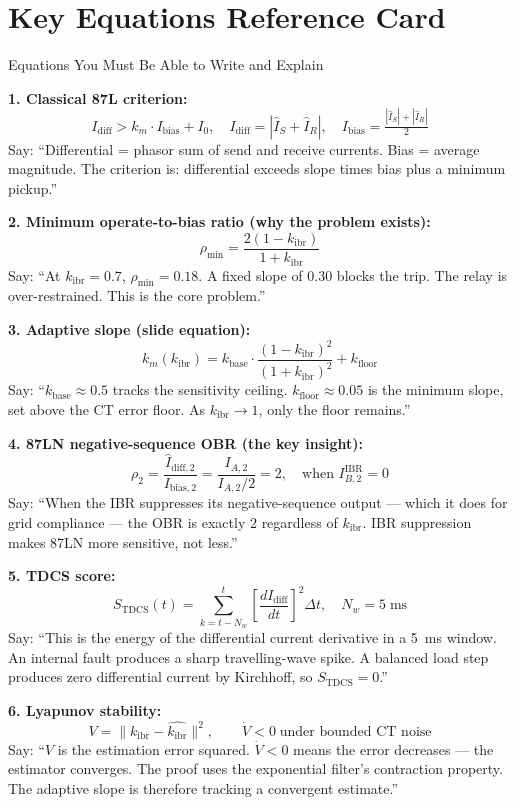 \documentclass[12pt,a4paper]{article}
\newcommand{\kibr}{k_\mathrm{ibr}}
\newcommand{\Idiff}{I_\mathrm{diff}}
\newcommand{\Ibias}{I_\mathrm{bias}}
\newcommand{\km}{k_m}
\newcommand{\kbase}{k_\mathrm{base}}
\newcommand{\kfloor}{k_\mathrm{floor}}
\begin{document}
\section{Key Equations Reference Card}

\begin{formulabox}{Equations You Must Be Able to Write and Explain}

\textbf{1. Classical 87L criterion:}
\[
  \Idiff > \km \cdot \Ibias + I_0, \quad
  \Idiff = |\hat{I}_S + \hat{I}_R|, \quad
  \Ibias = \tfrac{|\hat{I}_S| + |\hat{I}_R|}{2}
\]
Say: ``Differential = phasor sum of send and receive currents. Bias = average magnitude. The criterion is: differential exceeds slope times bias plus a minimum pickup.''

\textbf{2. Minimum operate-to-bias ratio (why the problem exists):}
\[
  \rho_\mathrm{min} = \frac{2(1-\kibr)}{1+\kibr}
\]
Say: ``At $\kibr = 0.7$, $\rho_\mathrm{min} = 0.18$. A fixed slope of 0.30 blocks the trip. The relay is over-restrained. This is the core problem.''

\textbf{3. Adaptive slope (slide equation):}
\[
  \km(\kibr) = \kbase \cdot \frac{(1-\kibr)^2}{(1+\kibr)^2} + \kfloor
\]
Say: ``$k_\mathrm{base} \approx 0.5$ tracks the sensitivity ceiling. $k_\mathrm{floor} \approx 0.05$ is the minimum slope, set above the CT error floor. As $k_\mathrm{ibr} \to 1$, only the floor remains.''

\textbf{4. 87LN negative-sequence OBR (the key insight):}
\[
  \rho_2 = \frac{\hat{I}_{\mathrm{diff},2}}{I_{\mathrm{bias},2}}
    = \frac{I_{A,2}}{I_{A,2}/2} = 2, \quad \text{when } I_{B,2}^\mathrm{IBR} = 0
\]
Say: ``When the IBR suppresses its negative-sequence output --- which it does for grid compliance --- the OBR is exactly 2 regardless of $k_\mathrm{ibr}$. IBR suppression makes 87LN more sensitive, not less.''

\textbf{5. TDCS score:}
\[
  S_\mathrm{TDCS}(t) = \sum_{k=t-N_w}^{t} \!\left[\frac{d\Idiff}{dt}\right]^2 \Delta t, \quad N_w = 5\;\text{ms}
\]
Say: ``This is the energy of the differential current derivative in a 5~ms window. An internal fault produces a sharp travelling-wave spike. A balanced load step produces zero differential current by Kirchhoff, so $S_\mathrm{TDCS} = 0$.''

\textbf{6. Lyapunov stability:}
\[
  V = \|\kibr - \hat{\kibr}\|^2, \qquad \dot{V} < 0 \;\text{under bounded CT noise}
\]
Say: ``$V$ is the estimation error squared. $\dot{V} < 0$ means the error decreases --- the estimator converges. The proof uses the exponential filter's contraction property. The adaptive slope is therefore tracking a convergent estimate.''
\end{formulabox}
\end{document}
